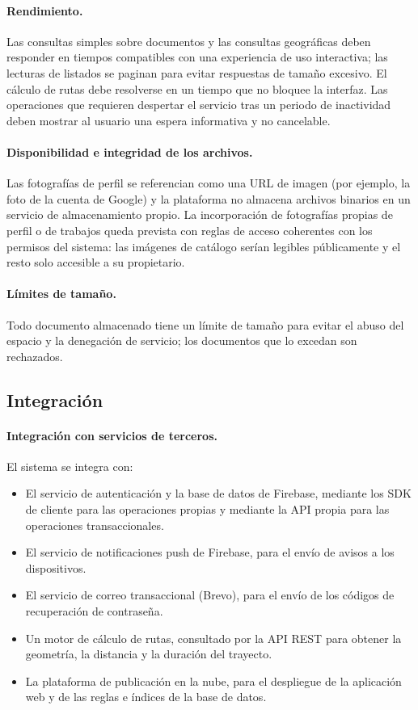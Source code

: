 \documentclass[doc,12pt,a4paper]{apa7}
\begin{document}
\paragraph{Rendimiento.}
Las consultas simples sobre documentos y las consultas geográficas deben
responder en tiempos compatibles con una experiencia de uso interactiva; las
lecturas de listados se paginan para evitar respuestas de tamaño excesivo. El
cálculo de rutas debe resolverse en un tiempo que no bloquee la interfaz. Las
operaciones que requieren despertar el servicio tras un periodo de inactividad
deben mostrar al usuario una espera informativa y no cancelable.

\paragraph{Disponibilidad e integridad de los archivos.}
Las fotografías de perfil se referencian como una URL de imagen (por ejemplo, la
foto de la cuenta de Google) y la plataforma no almacena archivos binarios en un
servicio de almacenamiento propio. La incorporación de fotografías propias de
perfil o de trabajos queda prevista con reglas de acceso coherentes con los
permisos del sistema: las imágenes de catálogo serían legibles públicamente y el
resto solo accesible a su propietario.

\paragraph{Límites de tamaño.}
Todo documento almacenado tiene un límite de tamaño para evitar el abuso del
espacio y la denegación de servicio; los documentos que lo excedan son
rechazados.

\subsection{Integración}

\paragraph{Integración con servicios de terceros.}
El sistema se integra con:
\begin{itemize}
    \item El servicio de autenticación y la base de datos de Firebase, mediante
          los SDK de cliente para las operaciones propias y mediante la API
          propia para las operaciones transaccionales.
    \item El servicio de notificaciones push de Firebase, para el envío de avisos
          a los dispositivos.
    \item El servicio de correo transaccional (Brevo), para el envío de los
          códigos de recuperación de contraseña.
    \item Un motor de cálculo de rutas, consultado por la API REST para obtener
          la geometría, la distancia y la duración del trayecto.
    \item La plataforma de publicación en la nube, para el despliegue de la
          aplicación web y de las reglas e índices de la base de datos.
\end{itemize}
\end{document}
